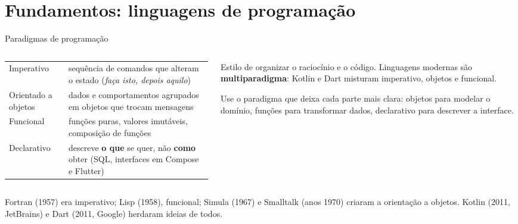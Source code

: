 \section{Fundamentos: linguagens de programação}

\begin{frame}{Paradigmas de programação}
  \begin{columns}[T]
    \begin{column}{0.54\textwidth}
      \scriptsize
      \begin{tabularx}{\linewidth}{@{}l L@{}}
        \toprule
         &  \\
        \midrule
        Imperativo & sequência de comandos que alteram o estado (\emph{faça isto, depois aquilo}) \\
        Orientado a objetos & dados e comportamentos agrupados em objetos que trocam mensagens \\
        Funcional & funções puras, valores imutáveis, composição de funções \\
        Declarativo & descreve \textbf{o que} se quer, não \textbf{como} obter (SQL, interfaces em Compose e Flutter) \\
        \bottomrule
      \end{tabularx}
    \end{column}
    \begin{column}{0.44\textwidth}
      \begin{definicao}[Paradigma]
        Estilo de organizar o raciocínio e o código. Linguagens modernas são \textbf{multiparadigma}: Kotlin e Dart misturam imperativo, objetos e funcional.
      \end{definicao}
      \begin{dica}
        Use o paradigma que deixa cada parte mais clara: objetos para modelar o domínio, funções para transformar dados, declarativo para descrever a interface.
      \end{dica}
    \end{column}
  \end{columns}
  \begin{historia}
    Fortran (1957) era imperativo; Lisp (1958), funcional; Simula (1967) e Smalltalk (anos 1970) criaram a orientação a objetos. Kotlin (2011, JetBrains) e Dart (2011, Google) herdaram ideias de todos.
  \end{historia}
\end{frame}

